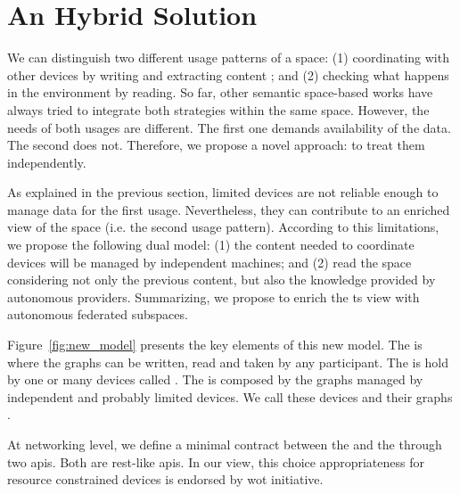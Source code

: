 \section{An Hybrid Solution} %
\label{sec:hybrid_solution}

We can distinguish two different usage patterns of a space:
(1) coordinating with other devices by writing and extracting content ; and %
(2) checking what happens in the environment by reading.
So far, other semantic space-based works have always tried to integrate both strategies within the same space.
However, the needs of both usages are different.
The first one demands availability of the data.
The second does not. %
Therefore, we propose a novel approach: to treat them independently.



As explained in the previous section, limited devices are not reliable enough to manage data for the first usage.
Nevertheless, they can contribute to an enriched view of the space (i.e. the second usage pattern).
According to this limitations, we propose the following dual model:
(1) the content needed to coordinate devices will be managed by independent machines; and
(2) read the space considering not only the previous content, but also the knowledge provided by autonomous providers.
Summarizing, we propose to enrich the \ac{ts} view with autonomous federated subspaces.


Figure~\ref{fig:new_model} presents the key elements of this new model.
The \coordspace{} is where the graphs can be written, read and taken by any participant.
The \coordspace{} is hold by one or many devices called \coordinators{}.
The \outerspace{} is composed by the graphs managed by independent and probably limited devices.
We call these devices \asteroids{} and their graphs \selfgraphs{}.



At networking level, we define a minimal contract between the \asteroids{} and the \coordinators{} through two \acp{api}.
Both are \ac{rest}-like \acp{api}.
In our view, this choice appropriateness for resource constrained devices is endorsed by \ac{wot} initiative.


